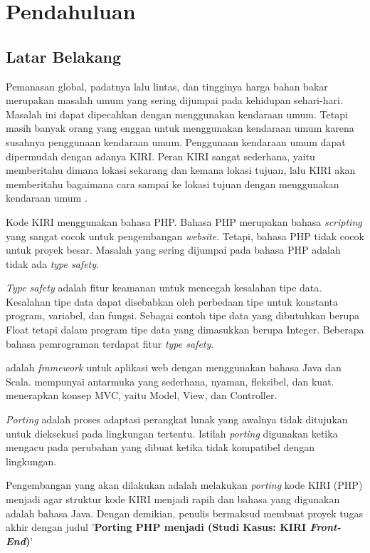 \chapter{Pendahuluan}
\label{chap:pendahuluan}

\section{Latar Belakang}
\label{sec:latarbelakang}

Pemanasan global, padatnya lalu lintas, dan tingginya harga bahan bakar merupakan masalah umum yang sering dijumpai pada kehidupan sehari-hari. Masalah ini dapat dipecahkan dengan menggunakan kendaraan umum. Tetapi masih banyak orang yang enggan untuk menggunakan kendaraan umum karena susahnya penggunaan kendaraan umum. Penggunaan kendaraan umum dapat dipermudah dengan adanya KIRI. Peran KIRI sangat sederhana, yaitu memberitahu dimana lokasi sekarang dan kemana lokasi tujuan, lalu KIRI akan memberitahu bagaimana cara sampai ke lokasi tujuan dengan menggunakan kendaraan umum \cite{statickiri}. 

Kode KIRI menggunakan bahasa PHP. Bahasa PHP \cite{phpnet} merupakan bahasa \textit{scripting} yang sangat cocok untuk pengembangan \textit{website}. Tetapi, bahasa PHP tidak cocok untuk proyek besar. Masalah yang sering dijumpai pada bahasa PHP adalah tidak ada \textit{type safety}. 

\textit{Type safety} \cite{type-safety} adalah fitur keamanan untuk mencegah kesalahan tipe data. Kesalahan tipe data dapat disebabkan oleh perbedaan tipe untuk konstanta program, variabel, dan fungsi. Sebagai contoh tipe data yang dibutuhkan berupa Float tetapi dalam program tipe data yang dimasukkan berupa Integer. Beberapa bahasa pemrograman terdapat fitur \textit{type safety}. 

\play adalah \textit{framework} untuk aplikasi web dengan menggunakan bahasa Java dan Scala. \play mempunyai antarmuka yang sederhana, nyaman, fleksibel, dan kuat. \play menerapkan konsep MVC, yaitu Model, View, dan Controller\cite{playforjava}. 

\textit{Porting} adalah proses adaptasi perangkat lunak yang awalnya tidak ditujukan untuk dieksekusi pada lingkungan tertentu. Istilah \textit{porting} digunakan ketika mengacu pada perubahan yang dibuat ketika tidak kompatibel dengan lingkungan.

Pengembangan yang akan dilakukan adalah melakukan \textit{porting} kode KIRI (PHP) menjadi \play agar struktur kode KIRI menjadi rapih dan bahasa yang digunakan adalah bahasa Java. Dengan demikian, penulis bermaksud membuat proyek tugas akhir dengan judul '\textbf{Porting PHP menjadi \play (Studi Kasus: KIRI \textit{Front-End})}'

